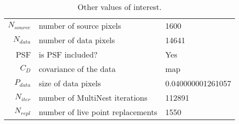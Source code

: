 \begin{table*}[!htb]\caption{Other values of interest.}\begin{center}\begin{tabular}{ r l l }\hline $N_{source}$ & number of source pixels           & 1600 \\ 
 $N_{data}$   & number of data pixels             & 14641 \\ 
 PSF & is PSF included?                          & Yes \\
 $C_D$        & covariance of the data            & map \\ 
 $P_{data}$   & size of data pixels               & 0.040000001261057 \\ 
 $N_{iter}$   & number of MultiNest iterations    & 112891 \\ 
 $N_{repl}$   & number of live point replacements & 1550 \\ 
\hline\end{tabular}\end{center}\label{tab:3}\end{table*}